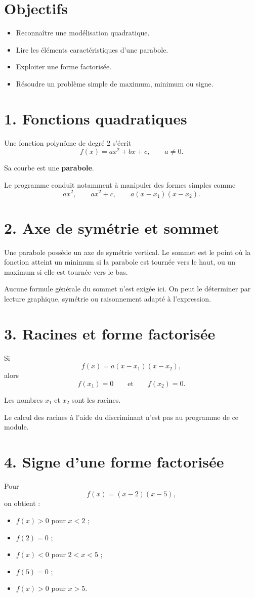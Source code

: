 \section{Objectifs}
\begin{itemize}
\item Reconnaître une modélisation quadratique.
\item Lire les éléments caractéristiques d'une parabole.
\item Exploiter une forme factorisée.
\item Résoudre un problème simple de maximum, minimum ou signe.
\end{itemize}

\section{1. Fonctions quadratiques}
Une fonction polynôme de degré 2 s'écrit
\[
f(x)=ax^2+bx+c,\qquad a\ne0.
\]

Sa courbe est une \textbf{parabole}.

Le programme conduit notamment à manipuler des formes simples comme
\[
ax^2,\qquad ax^2+c,\qquad a(x-x_1)(x-x_2).
\]

\section{2. Axe de symétrie et sommet}
Une parabole possède un axe de symétrie vertical. Le sommet est le point où la fonction atteint un minimum si la parabole est tournée vers le haut, ou un maximum si elle est tournée vers le bas.

Aucune formule générale du sommet n'est exigée ici. On peut le déterminer par lecture graphique, symétrie ou raisonnement adapté à l'expression.

\section{3. Racines et forme factorisée}
Si
\[
f(x)=a(x-x_1)(x-x_2),
\]
alors
\[
f(x_1)=0\qquad\text{et}\qquad f(x_2)=0.
\]

Les nombres $x_1$ et $x_2$ sont les racines.

Le calcul des racines à l'aide du discriminant n'est pas au programme de ce module.

\section{4. Signe d'une forme factorisée}
Pour
\[
f(x)=(x-2)(x-5),
\]
on obtient :
\begin{itemize}
\item $f(x)>0$ pour $x<2$ ;
\item $f(2)=0$ ;
\item $f(x)<0$ pour $2<x<5$ ;
\item $f(5)=0$ ;
\item $f(x)>0$ pour $x>5$.
\end{itemize}

